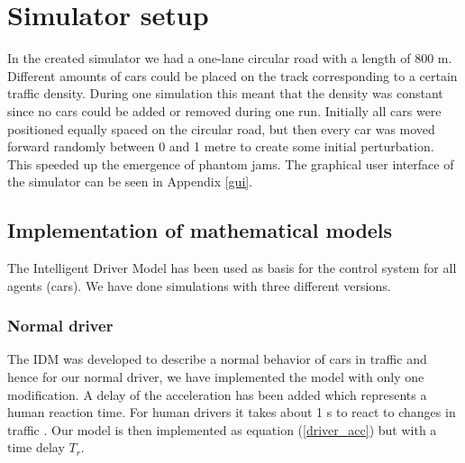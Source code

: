 \section{Simulator setup}
In the created simulator we had a one-lane circular road with a length of
800 m. Different amounts of cars could be placed on the track corresponding to
a certain traffic density. During one simulation this meant that the density
was constant since no cars could be added or removed during one run. Initially
all cars were positioned equally spaced on the circular road, but then every car
was moved forward randomly between 0 and 1 metre to create some initial
perturbation. This speeded up the emergence of phantom jams. The graphical user
interface of the simulator can be seen in Appendix \ref{gui}.

\subsection{Implementation of mathematical models}
The Intelligent Driver Model has been used as basis for the control system
for all agents (cars). We have done simulations with three different versions.

\begin{comment}
The three systems described in Sections (FIXME: ref till dessa tre modeller)
were implemented as described below. Since the simulator used a circular road
position of the car was transformed into an angle from 0 to 2\begin{math}\pi
\end{math} but since the acceleration and velocity were not affected by this,
the car was only aware of a straight road where the car going out in one
end started over from the other end.
\end{comment}

\subsubsection {Normal driver}
The IDM was developed to describe a normal behavior of cars in traffic
and hence for our normal driver, we have implemented the model with only one
modification. A delay of the acceleration has been added which represents a
human reaction time. For human drivers it takes about 1 s to react to changes in
traffic \cite{idm}. Our model is then implemented as equation (\ref{driver_acc})
but with a time delay \begin{math}T_r\end{math}.

